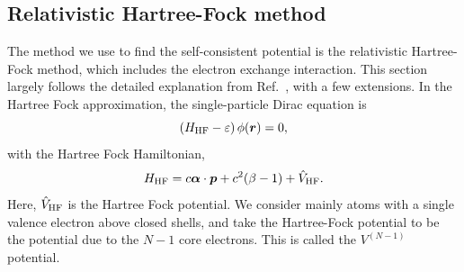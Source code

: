\documentclass[10pt,twocolumn,a4paper]{article}%
\renewcommand{\v}[1]{\ensuremath{\boldsymbol{#1}}}		%
\newcommand{\be}{\begin{equation}}
\newcommand{\ee}{\end{equation}}
\def\en{\ensuremath{\varepsilon}}
\begin{document}
\subsection{Relativistic Hartree-Fock method}

The method we use to find the self-consistent potential is the relativistic Hartree-Fock method, which includes the electron exchange interaction.
This section largely follows the detailed explanation from Ref.~\cite{JohnsonBook2007}, with a few extensions.
%
In the Hartree Fock approximation, the single-particle Dirac equation is
\be\label{eq:HF}
\left(H_{\rm HF} - \en\right) \phi(\v{r}) = 0,
\ee
with the Hartree Fock Hamiltonian,
\be\label{eq:H-HF}
H_{\rm HF}  = c \v{\alpha}\cdot\v{p} + c^2(\beta-1) + \hat V_{\rm HF}.
\ee
Here, $\hat V_{\rm HF}$ is the Hartree Fock potential.
We consider mainly atoms with a single valence electron above closed shells, and take the Hartree-Fock potential to be the potential due to the $N-1$ core electrons.
This is called the $V^{(N-1)}$ potential. %
\end{document}
